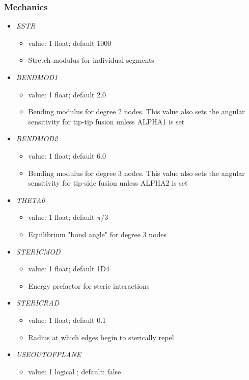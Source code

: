 \documentclass[12pt]{article}
\begin{document}
\subsubsection*{Mechanics}
\begin{itemize}
\item {\it ESTR}
\begin{itemize}
  \item  value: 1 float; default 1000
  \item Stretch modulus for individual segments
\end{itemize}
%
\item {\it BENDMOD1}
\begin{itemize}
  \item  value: 1 float; default 2.0
  \item Bending modulus for degree 2 nodes. This value also sets the angular sensitivity for tip-tip fusion unless ALPHA1 is set
\end{itemize}
%
\item {\it BENDMOD2}
\begin{itemize}
  \item  value: 1 float; default 6.0
  \item Bending modulus for degree 3 nodes. This value also sets the angular sensitivity for tip-side fusion unless ALPHA2 is set
\end{itemize}
%
\item {\it THETA0}
\begin{itemize}
  \item  value: 1 float; default $\pi/3$
  \item Equilibrium "bond angle" for degree 3 nodes
\end{itemize}
%
\item {\it STERICMOD}
\begin{itemize}
  \item  value: 1 float; default 1D4
  \item Energy prefactor for steric interactions
\end{itemize}
%
\item {\it STERICRAD}
\begin{itemize}
  \item  value: 1 float; default 0.1
  \item Radius at which edges begin to sterically repel
\end{itemize}
  \item {\it USEOUTOFPLANE}
    \begin{itemize}
      \item  value: 1 logical ; default: false

\end{itemize}
\end{itemize}
\end{document}
